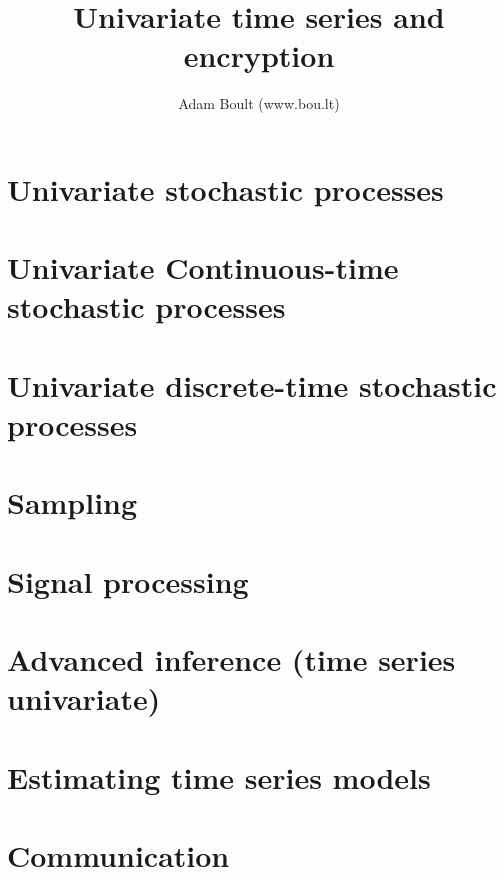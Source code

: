 \documentclass[oneside]{book}
\begin{document}
\author{Adam Boult (www.bou.lt)}
\title{Univariate time series and encryption}
\maketitle

\setcounter{tocdepth}{0}
\tableofcontents



\part{Univariate stochastic processes}







\part{Univariate Continuous-time stochastic processes}



\part{Univariate discrete-time stochastic processes}



\part{Sampling}




\part{Signal processing}






\part{Advanced inference (time series univariate)}


\part{Estimating time series models}






\part{Communication}




\end{document}
